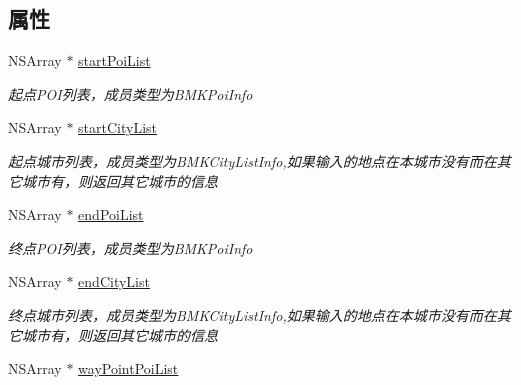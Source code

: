 \subsection*{属性}
\begin{DoxyCompactItemize}
\item 
\hypertarget{interface_b_m_k_suggest_addr_info_aca634e3aa38db8cb6127c080969ad327}{N\+S\+Array $\ast$ \hyperlink{interface_b_m_k_suggest_addr_info_aca634e3aa38db8cb6127c080969ad327}{start\+Poi\+List}}\label{interface_b_m_k_suggest_addr_info_aca634e3aa38db8cb6127c080969ad327}

\begin{DoxyCompactList}\small\item\em 起点\+P\+O\+I列表，成员类型为\+B\+M\+K\+Poi\+Info \end{DoxyCompactList}\item 
\hypertarget{interface_b_m_k_suggest_addr_info_afdffb61936341d125e268202000ae551}{N\+S\+Array $\ast$ \hyperlink{interface_b_m_k_suggest_addr_info_afdffb61936341d125e268202000ae551}{start\+City\+List}}\label{interface_b_m_k_suggest_addr_info_afdffb61936341d125e268202000ae551}

\begin{DoxyCompactList}\small\item\em 起点城市列表，成员类型为\+B\+M\+K\+City\+List\+Info,如果输入的地点在本城市没有而在其它城市有，则返回其它城市的信息 \end{DoxyCompactList}\item 
\hypertarget{interface_b_m_k_suggest_addr_info_a4e7a759214b84050b0b47d059eb3ed9d}{N\+S\+Array $\ast$ \hyperlink{interface_b_m_k_suggest_addr_info_a4e7a759214b84050b0b47d059eb3ed9d}{end\+Poi\+List}}\label{interface_b_m_k_suggest_addr_info_a4e7a759214b84050b0b47d059eb3ed9d}

\begin{DoxyCompactList}\small\item\em 终点\+P\+O\+I列表，成员类型为\+B\+M\+K\+Poi\+Info \end{DoxyCompactList}\item 
\hypertarget{interface_b_m_k_suggest_addr_info_a4ab8bde0ab4def7c2de3a57b7447e16a}{N\+S\+Array $\ast$ \hyperlink{interface_b_m_k_suggest_addr_info_a4ab8bde0ab4def7c2de3a57b7447e16a}{end\+City\+List}}\label{interface_b_m_k_suggest_addr_info_a4ab8bde0ab4def7c2de3a57b7447e16a}

\begin{DoxyCompactList}\small\item\em 终点城市列表，成员类型为\+B\+M\+K\+City\+List\+Info,如果输入的地点在本城市没有而在其它城市有，则返回其它城市的信息 \end{DoxyCompactList}\item 
\hypertarget{interface_b_m_k_suggest_addr_info_aa84760d7426d319275a06d1e2169bb91}{N\+S\+Array $\ast$ \hyperlink{interface_b_m_k_suggest_addr_info_aa84760d7426d319275a06d1e2169bb91}{way\+Point\+Poi\+List}}\label{interface_b_m_k_suggest_addr_info_aa84760d7426d319275a06d1e2169bb91}


\end{DoxyCompactItemize}
